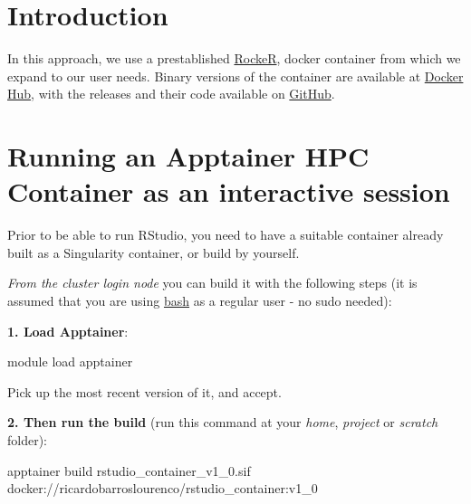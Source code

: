 \documentclass[
]{book}
\newenvironment{Shaded}{\begin{snugshade}}{\end{snugshade}}
\newcommand{\ExtensionTok}[1]{#1}
\newcommand{\NormalTok}[1]{#1}
\begin{document}
\hypertarget{introduction}{%
\section{Introduction}\label{introduction}}

In this approach, we use a prestablished \href{https://rocker-project.org/}{RockeR},
docker container from which we expand to our user needs. Binary versions of the
container are available at \href{https://hub.docker.com/repository/docker/ricardobarroslourenco/rstudio_container/general}{Docker Hub}, with the releases and their code available on \href{https://github.com/MacRemoteSensing/rstudio_container/releases}{GitHub}.

\hypertarget{running-an-apptainer-hpc-container-as-an-interactive-session}{%
\section{Running an Apptainer HPC Container as an interactive session}\label{running-an-apptainer-hpc-container-as-an-interactive-session}}

Prior to be able to run RStudio, you need to have a suitable container already built
as a Singularity container, or build by yourself.

\emph{From the cluster login node} you can build it with the following steps (it is assumed that you are using \href{https://en.wikipedia.org/wiki/Bash_(Unix_shell)}{bash} as a regular user - no sudo needed):

\textbf{1. Load Apptainer}:

\begin{Shaded}
\begin{Highlighting}[]
\ExtensionTok{module}\NormalTok{ load apptainer}
\end{Highlighting}
\end{Shaded}

Pick up the most recent version of it, and accept.

\textbf{2. Then run the build} (run this command at your \emph{home}, \emph{project} or \emph{scratch} folder):

\begin{Shaded}
\begin{Highlighting}[]
\ExtensionTok{apptainer}\NormalTok{ build rstudio\_container\_v1\_0.sif docker://ricardobarroslourenco/rstudio\_container:v1\_0}
\end{Highlighting}
\end{Shaded}
\end{document}
